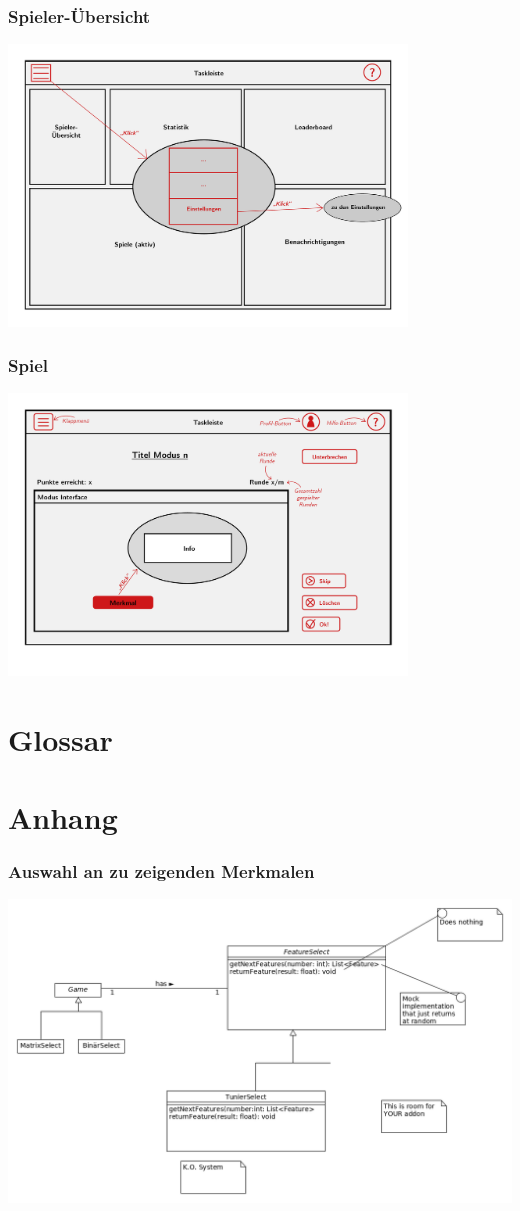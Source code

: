 \documentclass[a4paper]{scrreprt}
\begin{document}
    \subsection{Spieler-Übersicht}
    \label{fig:Spieler-Übersicht}
    \centering
    \includegraphics[width=400px]{../pictures/5_Spieler.jpg}

    \subsection{Spiel}
    \centering
    \includegraphics[width=400px]{../pictures/4_Spielerstellung.jpg}

    \clearpage


    \chapter{Glossar}
    \printglossary
    \chapter{Anhang}
    \subsection{Auswahl an zu zeigenden Merkmalen}
    \label{fig:FeatureSelect}
    \includegraphics[width=\textwidth]{uml/export/FeatureSelect.png}
    
\end{document}
